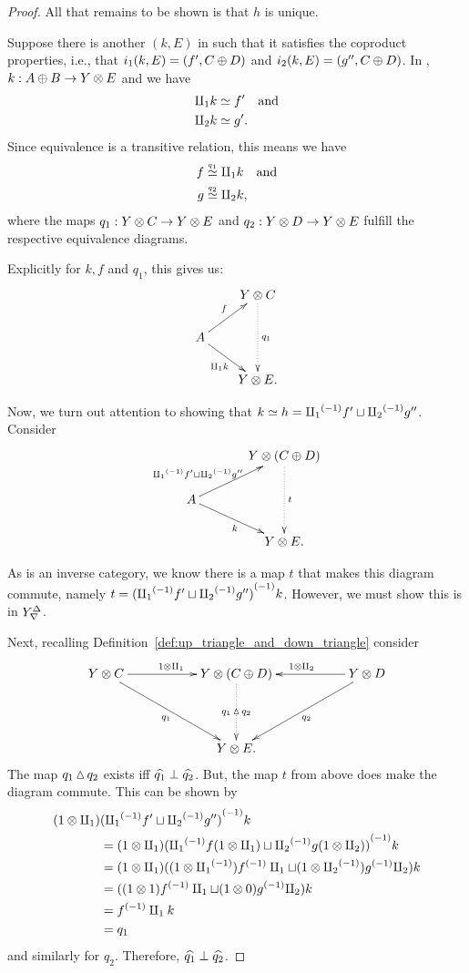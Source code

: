 \begin{proof}
  All that remains to be shown is that $h$ is unique.

  Suppose there is another $(k,E)$ in \Xt such that it satisfies the coproduct properties, i.e.,
  that $i_1 (k,E) = (f',C\oplus D)$ and $i_2 (k,E) = (g'',C\oplus D)$. In \X, $k:A\oplus B \to Y \otimes E$ and we have
  \begin{align*}
    \amalg_{1} k &\overset{\scriptscriptstyle }{\simeq} f'\quad\text{and}\\
    \amalg_{2} k &\overset{\scriptscriptstyle }{\simeq} g'.
  \end{align*}
  Since equivalence is a transitive relation, this means we have
  \begin{align*}
    f &\overset{\scriptscriptstyle q_1}{\simeq} \amalg_{1} k\quad\text{and}\\
    g &\overset{\scriptscriptstyle q_2}{\simeq} \amalg_{2} k,
  \end{align*}
  where the maps $q_1: Y\otimes C \to Y\otimes E$ and $q_2:Y\otimes D \to Y\otimes E$ fulfill the respective equivalence diagrams.

  Explicitly for $k, f$ and $q_1$, this gives us:
  \[
    \xymatrix @C=20pt @R=20pt{
      & Y \* C \ar@{.>}[dd]^{q_1}\\
      A \ar[ur]^{f} \ar[dr]_{\cpa k} \\
      & Y\*E.
    }
  \]

  Now, we turn out attention to showing that $k \overset{\scriptscriptstyle }{\simeq} h = {\amalg_{1}}^{(-1)} f' \sqcup {\amalg_{2}}^{(-1)} g''$. Consider
  \begin{equation}
    \xymatrix @C=35pt @R=20pt{
      & Y \* (C\+D)\ar@{.>}[dd]^{t}\\
      A \ar[ur]^(.4){\icpa f' \djoin \icpb g''\ \ \,} \ar[dr]_{k} \\
      & Y\*E.
    }\label{diag:k-equiv-f-djoin-g}
  \end{equation}

  As \X is an inverse category, we know there is a map $t$ that makes this diagram commute,
  namely $t =  {({\amalg_{1}}^{(-1)} f' \sqcup {\amalg_{2}}^{(-1)} g'')}^{(-1)}k$. However, we must show this is in ${Y}^{\Delta}_{\nabla}$.

  Next, recalling Definition~\ref{def:up_triangle_and_down_triangle} consider
  \begin{equation*}
    \xymatrix@C+0pt @R+20pt{
      Y\*C\ar[rr]^{1\*\cpa} \ar[drr]_{q_1} &&Y\*(C\+D)   \ar@{.>}[d]|-{q_1\tjup q_2}
        && Y\*D \ar[ll]_{1\*\cpb} \ar[dll]^{q_2}\\
      &&Y\*E.
      }%
  \end{equation*}
  The map $q_1\operatorname{\vartriangle} q_2$ exists iff $\widehat{q_1} \perp \widehat{q_2}$. But, the map $t$ from above
  does make the diagram commute. This can be shown by
  \begin{align*}
    (1\*\cpa)& \inv{(\icpa f' \djoin \icpb g'')}k\\
    &=  (1\*\cpa)\inv{(\icpa f(1\*\cpa) \djoin \icpb g(1\*\cpb))}k\\
    &=  (1\*\cpa)((1\*\icpa) \inv{f}\cpa \djoin (1\*\icpb) \inv{g}\cpb) k \\
    &=  ((1\*1) \inv{f}\cpa \djoin (1\*0) \inv{g}\cpb) k \\ %
    &=  \inv{f} \cpa k\\
    &= q_1
  \end{align*}
  and similarly for $q_2$. Therefore,  $\widehat{q_1} \perp \widehat{q_2}$.


\end{proof}
